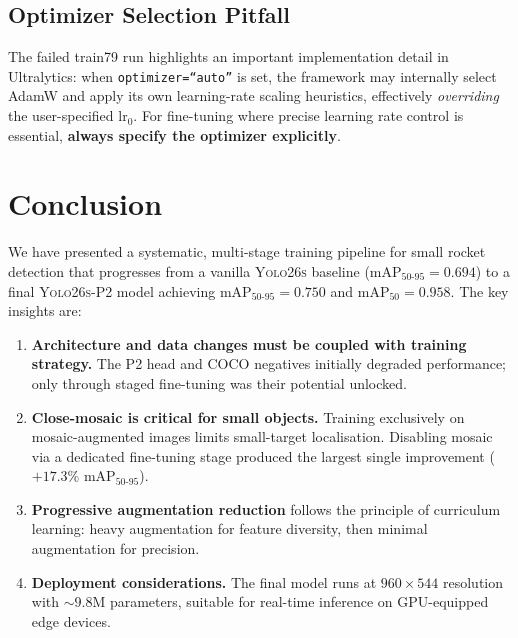 \documentclass[11pt, a4paper]{article}
\newcommand{\mapfifty}{\text{mAP}_{50}}
\newcommand{\mapfull}{\text{mAP}_{50\text{-}95}}
\newcommand{\yolobase}{\textsc{Yolo26s}}
\newcommand{\yolop}{\textsc{Yolo26s-P2}}
\begin{document}
\subsection{Optimizer Selection Pitfall}

The failed train79 run highlights an important implementation detail in
Ultralytics: when \texttt{optimizer=``auto''} is set, the framework may
internally select AdamW and apply its own learning-rate scaling heuristics,
effectively \emph{overriding} the user-specified $\text{lr}_0$. For fine-tuning
where precise learning rate control is essential, \textbf{always specify the
  optimizer explicitly}.

\section{Conclusion}
\label{sec:conclusion}

We have presented a systematic, multi-stage training pipeline for small rocket
detection that progresses from a vanilla \yolobase{} baseline ($\mapfull =
  0.694$) to a final \yolop{} model achieving $\mapfull = 0.750$ and $\mapfifty =
  0.958$. The key insights are:

\begin{enumerate}[leftmargin=*]
  \item \textbf{Architecture and data changes must be coupled with
          training strategy.}  The P2 head and COCO negatives initially
        degraded performance; only through staged fine-tuning was
        their potential unlocked.

  \item \textbf{Close-mosaic is critical for small objects.}
        Training exclusively on mosaic-augmented images limits
        small-target localisation.  Disabling mosaic via a dedicated
        fine-tuning stage produced the largest single improvement
        ($+17.3\%$ $\mapfull$).

  \item \textbf{Progressive augmentation reduction} follows the
        principle of curriculum learning: heavy augmentation for
        feature diversity, then minimal augmentation for precision.

  \item \textbf{Deployment considerations.}  The final model runs
        at $960{\times}544$ resolution with ${\sim}9.8$M parameters,
        suitable for real-time inference on GPU-equipped edge devices.
\end{enumerate}
\end{document}
